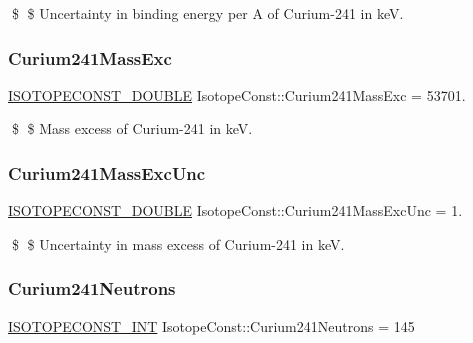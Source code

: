 \$ \$ Uncertainty in binding energy per A of Curium-\/241 in keV. \mbox{\label{group___isotope_const-_curium-_cm241_ga9b03c7cfd2e46b35314d76c558da22f1}} 
\subsubsection{\texorpdfstring{Curium241\+Mass\+Exc}{Curium241MassExc}}
{\footnotesize\ttfamily \mbox{\hyperlink{group___isotope_const-_macros_ga8f45a7272ce02c0b4c65c44636ed719a}{I\+S\+O\+T\+O\+P\+E\+C\+O\+N\+S\+T\+\_\+\+D\+O\+U\+B\+LE}} Isotope\+Const\+::\+Curium241\+Mass\+Exc = 53701.}

\$ \$ Mass excess of Curium-\/241 in keV. \mbox{\label{group___isotope_const-_curium-_cm241_ga70083179f7897a59c72be5bd90fc7120}} 
\subsubsection{\texorpdfstring{Curium241\+Mass\+Exc\+Unc}{Curium241MassExcUnc}}
{\footnotesize\ttfamily \mbox{\hyperlink{group___isotope_const-_macros_ga8f45a7272ce02c0b4c65c44636ed719a}{I\+S\+O\+T\+O\+P\+E\+C\+O\+N\+S\+T\+\_\+\+D\+O\+U\+B\+LE}} Isotope\+Const\+::\+Curium241\+Mass\+Exc\+Unc = 1.}

\$ \$ Uncertainty in mass excess of Curium-\/241 in keV. \mbox{\label{group___isotope_const-_curium-_cm241_gaa79a946782931780e9ce6164375d911a}} 
\subsubsection{\texorpdfstring{Curium241\+Neutrons}{Curium241Neutrons}}
{\footnotesize\ttfamily \mbox{\hyperlink{group___isotope_const-_macros_ga5f18360b3e99483a35c32d789e62621c}{I\+S\+O\+T\+O\+P\+E\+C\+O\+N\+S\+T\+\_\+\+I\+NT}} Isotope\+Const\+::\+Curium241\+Neutrons = 145}

